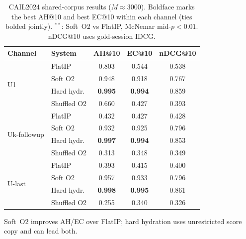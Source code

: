 \documentclass[preprint,12pt,authoryear]{elsarticle}
\newcommand{\compacttab}{\setlength{\tabcolsep}{4.5pt}\renewcommand{\arraystretch}{1.05}}
\begin{document}
\begin{table}[H]
\centering
\caption{CAIL2024 shared-corpus results ($M\approx 3000$). Boldface marks the best AH@10 and best EC@10 within each channel (ties bolded jointly). ${}^{**}$: Soft~O2 vs FlatIP, McNemar mid-$p{<}0.01$. nDCG@10 uses gold-session IDCG.}
\label{tab:cail_main}
\compacttab\footnotesize
\begin{tabular}{@{}llccc@{}}
\toprule
\textbf{Channel} & \textbf{System} & \textbf{AH@10} & \textbf{EC@10} & \textbf{nDCG@10} \\
\midrule
\multirow{4}{*}{U1}
 & FlatIP & 0.803 & 0.544 & 0.538 \\
 & Soft O2 & 0.948 & 0.918 & 0.767 \\
 & Hard hydr. & \textbf{0.995} & \textbf{0.994} & 0.859 \\
 & Shuffled O2 & 0.660 & 0.427 & 0.393 \\
\midrule
\multirow{4}{*}{Uk-followup}
 & FlatIP & 0.432 & 0.427 & 0.428 \\
 & Soft O2 & 0.932 & 0.925 & 0.796 \\
 & Hard hydr. & \textbf{0.997} & \textbf{0.994} & 0.853 \\
 & Shuffled O2 & 0.313 & 0.348 & 0.349 \\
\midrule
\multirow{4}{*}{U-last}
 & FlatIP & 0.393 & 0.415 & 0.400 \\
 & Soft O2 & 0.957 & 0.933 & 0.796 \\
 & Hard hydr. & \textbf{0.998} & \textbf{0.995} & 0.861 \\
 & Shuffled O2 & 0.255 & 0.340 & 0.326 \\
\bottomrule
\end{tabular}
\end{table}
{\footnotesize Soft~O2 improves AH/EC over FlatIP; hard hydration uses unrestricted score copy and can lead both.}
\end{document}

